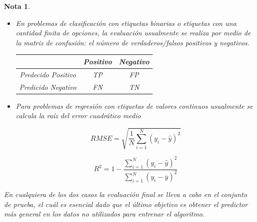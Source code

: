 \documentclass[12pt]{article}
\newtheorem{Note}{Nota}%
\begin{document}
\begin{Note}
\begin{itemize}

\item En problemas de clasificación con etiquetas binarias o etiquetas con una cantidad finita de opciones, la evaluación usualmente se realiza por medio de la matriz de confusión: el número de verdaderos/falsos positivos y negativos.

\begin{center}
\begin{tabular}{|c|c|c|}\hline
& Positivo & Negativo\\\hline
Predecido Positivo& TP & FP\\\hline
Predicido Negativo& FN & TN\\\hline
\end{tabular}
\end{center}

\item Para problemas de regresión con etiquetas de valores continuos usualmente se calcula la raíz del error cuadrático medio

\begin{equation}
RMSE=\sqrt{\frac{1}{N}\sum_{i=1}^{N}\left(y_{i}-\hat{y}\right)^2}
\end{equation}


\begin{equation}
R^2=1-\frac{\sum_{i=1}^{N}\left(y_{i}-\hat{y}\right)^2}{\sum_{i=1}^{N}\left(y_{i}-\overline{y}\right)^2}
\end{equation}

\end{itemize}

En cualquiera de los dos casos la evaluación final se lleva a cabo en el conjunto de prueba, el cuál es esencial dado que el último objetivo es obtener el predictor más general en los datos no utilizados para entrenar el algoritmo.
\end{Note}
\end{document}
